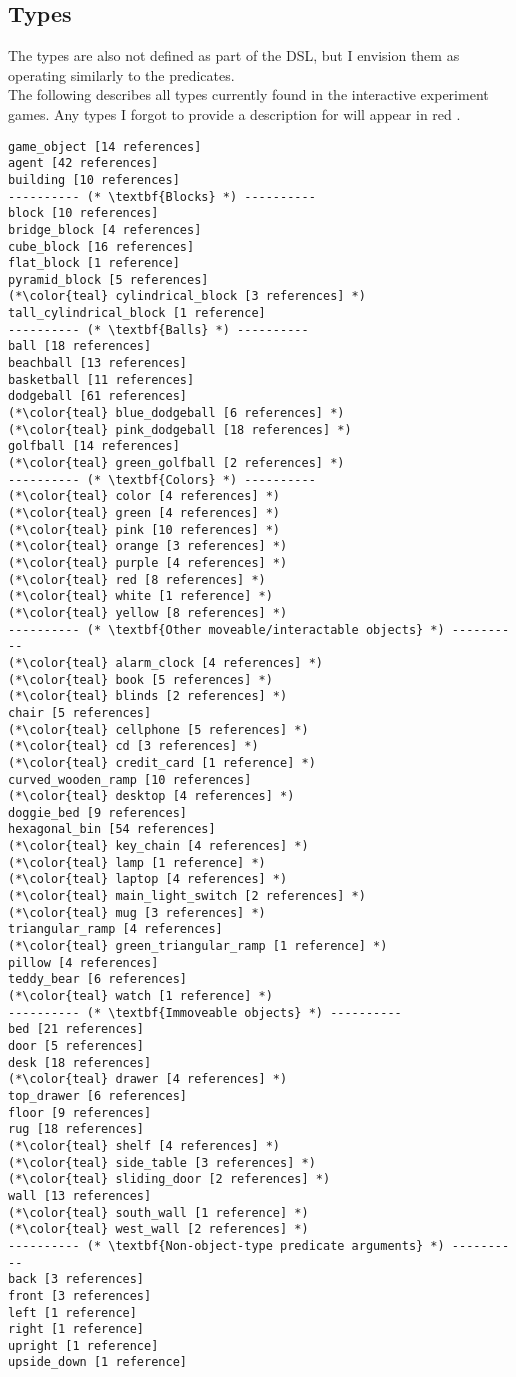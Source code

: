\documentclass{article}
\begin{document}
\subsection{Types}
The types are also not defined as part of the DSL, but I envision them as operating similarly to the predicates. \\
            
            The following describes all types currently found in the interactive experiment games. Any types I forgot to provide a description for will appear in {\color{red}red }.
        
\begin{lstlisting}
game_object [14 references] 
agent [42 references] 
building [10 references] 
---------- (* \textbf{Blocks} *) ----------
block [10 references] 
bridge_block [4 references] 
cube_block [16 references] 
flat_block [1 reference] 
pyramid_block [5 references] 
(*\color{teal} cylindrical_block [3 references] *)
tall_cylindrical_block [1 reference] 
---------- (* \textbf{Balls} *) ----------
ball [18 references] 
beachball [13 references] 
basketball [11 references] 
dodgeball [61 references] 
(*\color{teal} blue_dodgeball [6 references] *)
(*\color{teal} pink_dodgeball [18 references] *)
golfball [14 references] 
(*\color{teal} green_golfball [2 references] *)
---------- (* \textbf{Colors} *) ----------
(*\color{teal} color [4 references] *)
(*\color{teal} green [4 references] *)
(*\color{teal} pink [10 references] *)
(*\color{teal} orange [3 references] *)
(*\color{teal} purple [4 references] *)
(*\color{teal} red [8 references] *)
(*\color{teal} white [1 reference] *)
(*\color{teal} yellow [8 references] *)
---------- (* \textbf{Other moveable/interactable objects} *) ----------
(*\color{teal} alarm_clock [4 references] *)
(*\color{teal} book [5 references] *)
(*\color{teal} blinds [2 references] *)
chair [5 references] 
(*\color{teal} cellphone [5 references] *)
(*\color{teal} cd [3 references] *)
(*\color{teal} credit_card [1 reference] *)
curved_wooden_ramp [10 references] 
(*\color{teal} desktop [4 references] *)
doggie_bed [9 references] 
hexagonal_bin [54 references] 
(*\color{teal} key_chain [4 references] *)
(*\color{teal} lamp [1 reference] *)
(*\color{teal} laptop [4 references] *)
(*\color{teal} main_light_switch [2 references] *)
(*\color{teal} mug [3 references] *)
triangular_ramp [4 references] 
(*\color{teal} green_triangular_ramp [1 reference] *)
pillow [4 references] 
teddy_bear [6 references] 
(*\color{teal} watch [1 reference] *)
---------- (* \textbf{Immoveable objects} *) ----------
bed [21 references] 
door [5 references] 
desk [18 references] 
(*\color{teal} drawer [4 references] *)
top_drawer [6 references] 
floor [9 references] 
rug [18 references] 
(*\color{teal} shelf [4 references] *)
(*\color{teal} side_table [3 references] *)
(*\color{teal} sliding_door [2 references] *)
wall [13 references] 
(*\color{teal} south_wall [1 reference] *)
(*\color{teal} west_wall [2 references] *)
---------- (* \textbf{Non-object-type predicate arguments} *) ----------
back [3 references] 
front [3 references] 
left [1 reference] 
right [1 reference] 
upright [1 reference] 
upside_down [1 reference] 
\end{lstlisting}
\end{document}
